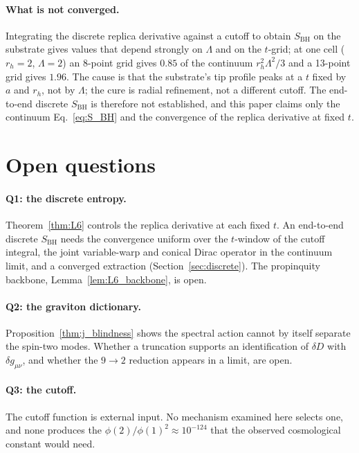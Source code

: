 \documentclass[11pt,a4paper]{article}
\theoremstyle{plain}
\theoremstyle{definition}
\newcommand{\BH}{\mathrm{BH}}
\renewcommand{\_}{\textunderscore\allowbreak}
\begin{document}
\paragraph{What is not converged.} Integrating the discrete replica
derivative against a cutoff to obtain $S_{\BH}$ on the substrate gives
values that depend strongly on $\Lambda$ and on the $t$-grid; at one cell
($r_h = 2$, $\Lambda = 2$) an 8-point grid gives $0.85$ of the continuum
$r_h^2\Lambda^2/3$ and a 13-point grid gives $1.96$. The cause is that the
substrate's tip profile peaks at a $t$ fixed by $a$ and $r_h$, not by
$\Lambda$; the cure is radial refinement, not a different cutoff. The
end-to-end discrete $S_{\BH}$ is therefore not established, and this paper
claims only the continuum Eq.~\eqref{eq:S_BH} and the convergence of the
replica derivative at fixed $t$.

\section{Open questions}
\label{sec:open}

\paragraph{Q1: the discrete entropy.} Theorem~\ref{thm:L6} controls the
replica derivative at each fixed $t$. An end-to-end discrete $S_{\BH}$
needs the convergence uniform over the $t$-window of the cutoff integral,
the joint variable-warp and conical Dirac operator in the continuum limit,
and a converged extraction (Section~\ref{sec:discrete}). The propinquity
backbone, Lemma~\ref{lem:L6_backbone}, is open.

\paragraph{Q2: the graviton dictionary.} Proposition~\ref{thm:j_blindness}
shows the spectral action cannot by itself separate the spin-two modes.
Whether a truncation supports an identification of $\delta D$ with
$\delta g_{\mu\nu}$, and whether the $9 \to 2$ reduction appears in a
limit, are open.

\paragraph{Q3: the cutoff.} The cutoff function is external input. No
mechanism examined here selects one, and none produces the
$\phi(2)/\phi(1)^2 \approx 10^{-124}$ that the observed cosmological
constant would need.
\end{document}
